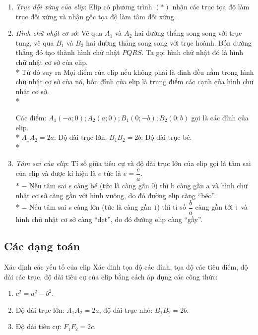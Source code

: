 \begin{enumerate}
	\item \textit{Trục đối xứng của elip}: 
	Elip có phương trình $(*)$ nhận các trục tọa độ làm trục đối xứng và nhận gốc tọa độ làm tâm đối xứng. 
	\item \textit{Hình chữ nhật cơ sở}:
	Vẽ qua ${A_1}$ và ${A_2}$ hai đường thẳng song song với trục tung, vẽ qua ${B_1}$ và ${B_2}$ hai đường thẳng song song với trục hoành. Bốn đường thẳng đó tạo thành hình chữ nhật $PQRS$. Ta gọi hình chữ nhật đó là hình chữ nhật cơ sở của elip.\\*
	Từ đó suy ra
	Mọi điểm của elip nếu không phải là đỉnh đều nằm trong hình chữ nhật cơ sở của nó, bốn đỉnh của elip là trung điểm các cạnh của hình chữ nhật cơ sở.\\*
	\begin{note}
		Các điểm: $A_{1}(-a;0);A_{2}(a;0);B_{1}(0;-b);B_{2}(0;b)$ gọi là các đỉnh của elip.\\*
		$A_{1}A_{2}=2a$: Độ dài trục lớn.
		$B_{1}B_{2}=2b$: Độ dài trục bé.\\*
	\end{note}
	\item \textit{Tâm sai của elip}:
	Tỉ số giữa tiêu cự và độ dài trục lớn của elip gọi là tâm sai của elip và được kí hiệu là $ e $ tức là $\boxed{e = \dfrac{c}{a}}$.\\*
	$ - $ Nếu tâm sai $ e $ càng bé (tức là càng gần $0$) thì b càng gần a và hình chữ nhật cơ sở càng gần với hình vuông, do đó đường elip càng “béo”.\\*
	$ - $ Nếu tâm sai $ e $ càng lớn (tức là càng gần $1$) thì tỉ số $\dfrac{b}{a}$ càng gần tới $1$ và hình chữ nhật cơ sở càng “dẹt”, do đó đường elip càng “gầy”.
\end{enumerate}
\subsection{Các dạng toán}
\begin{dang}{Xác định các yếu tố của elip}
	\indent 
	Xác đinh tọa độ các đỉnh, tọa độ các tiêu điểm, độ dài các trục, độ dài tiêu cự của elip bằng cách áp dụng các công thức:
\begin{enumerate}
\item $c^2 = a^2 - b^2$.
\item Độ dài trục lớn: $A_1 A_2 = 2a$, độ dài trục nhỏ: $B_1 B_2 = 2b$.
\item Độ dài tiêu cự: $F_1 F_2 = 2c$.
\end{enumerate}
\end{dang}

